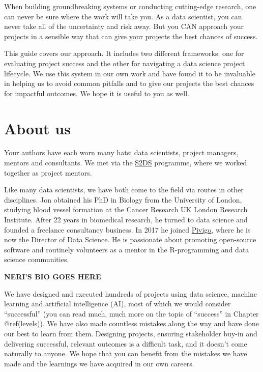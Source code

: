 \documentclass[
]{book}
\begin{document}
When building groundbreaking systems or conducting cutting-edge
research, one can never be sure where the work will take you. As a data
scientist, you can never take all of the uncertainty and risk away. But
you CAN approach your projects in a sensible way that can give your
projects the best chances of success.

This guide covers our approach. It includes two different frameworks:
one for evaluating project success and the other for navigating a data
science project lifecycle. We use this system in our own work and have
found it to be invaluable in helping us to avoid common pitfalls and to
give our projects the best chances for impactful outcomes. We hope it is
useful to you as well.

\hypertarget{about-us}{%
\section*{About us}\label{about-us}}

Your authors have each worn many hats: data scientists, project
managers, mentors and consultants. We met via the
\href{http://www.s2ds.org/}{S2DS} programme, where we worked together as
project mentors.

Like many data scientists, we have both come to the field via routes in
other disciplines. Jon obtained his PhD in Biology from the University
of London, studying blood vessel formation at the Cancer Research UK
London Research Institute. After 22 years in biomedical research, he
turned to data science and founded a freelance consultancy business. In
2017 he joined \href{https://www.pivigo.com}{Pivigo}, where he is now
the Director of Data Science. He is passionate about promoting
open-source software and routinely volunteers as a mentor in the
R-programming and data science communities.

\textbf{NERI'S BIO GOES HERE}

We have designed and executed hundreds of projects using data science,
machine learning and artificial intelligence (AI), most of which we
would consider ``successful'' (you can read much, much more on the topic
of ``success'' in Chapter @ref(levels)). We have also made countless
mistakes along the way and have done our best to learn from them.
Designing projects, ensuring stakeholder buy-in and delivering
successful, relevant outcomes is a difficult task, and it doesn't come
naturally to anyone. We hope that you can benefit from the mistakes we
have made and the learnings we have acquired in our own careers.
\end{document}
